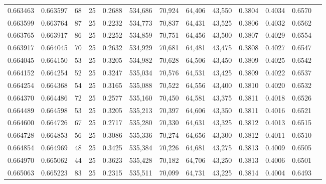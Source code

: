 \begin{tabular}{rrrrrrrrrrrrr}
0.663463 & 0.663597 &    68 &  25 &                                     0.2688 & 534,686 &  70,924 &  64,406 &  43,550 & 0.3804 & 0.4034 & 0.6570 \\
0.663599 & 0.663764 &    87 &  25 &                                     0.2232 & 534,773 &  70,837 &  64,431 &  43,525 & 0.3806 & 0.4032 & 0.6562 \\
0.663765 & 0.663917 &    86 &  25 &                                     0.2252 & 534,859 &  70,751 &  64,456 &  43,500 & 0.3807 & 0.4029 & 0.6554 \\
0.663917 & 0.664045 &    70 &  25 &                                     0.2632 & 534,929 &  70,681 &  64,481 &  43,475 & 0.3808 & 0.4027 & 0.6547 \\
0.664045 & 0.664150 &    53 &  25 &                                     0.3205 & 534,982 &  70,628 &  64,506 &  43,450 & 0.3809 & 0.4025 & 0.6542 \\
0.664152 & 0.664254 &    52 &  25 &                                     0.3247 & 535,034 &  70,576 &  64,531 &  43,425 & 0.3809 & 0.4022 & 0.6537 \\
0.664254 & 0.664368 &    54 &  25 &                                     0.3165 & 535,088 &  70,522 &  64,556 &  43,400 & 0.3810 & 0.4020 & 0.6532 \\
0.664370 & 0.664486 &    72 &  25 &                                     0.2577 & 535,160 &  70,450 &  64,581 &  43,375 & 0.3811 & 0.4018 & 0.6526 \\
0.664489 & 0.664598 &    53 &  25 &                                     0.3205 & 535,213 &  70,397 &  64,606 &  43,350 & 0.3811 & 0.4016 & 0.6521 \\
0.664600 & 0.664726 &    67 &  25 &                                     0.2717 & 535,280 &  70,330 &  64,631 &  43,325 & 0.3812 & 0.4013 & 0.6515 \\
0.664728 & 0.664853 &    56 &  25 &                                     0.3086 & 535,336 &  70,274 &  64,656 &  43,300 & 0.3812 & 0.4011 & 0.6510 \\
0.664854 & 0.664969 &    48 &  25 &                                     0.3425 & 535,384 &  70,226 &  64,681 &  43,275 & 0.3813 & 0.4009 & 0.6505 \\
0.664970 & 0.665062 &    44 &  25 &                                     0.3623 & 535,428 &  70,182 &  64,706 &  43,250 & 0.3813 & 0.4006 & 0.6501 \\
0.665063 & 0.665223 &    83 &  25 &                                     0.2315 & 535,511 &  70,099 &  64,731 &  43,225 & 0.3814 & 0.4004 & 0.6493 \\

\end{tabular}
